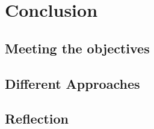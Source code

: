 \chapter{Conclusion}

\section{Meeting the objectives}

\section{Different Approaches}

\section{Reflection}